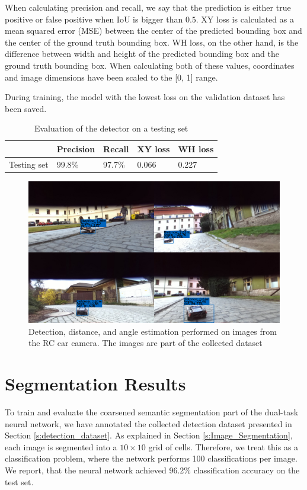 \documentclass{ctuthesis/ctuthesis}
\begin{document}
When calculating precision and recall, we say that the prediction is either true positive or false positive when IoU is bigger than $0.5$. XY loss is calculated as a mean squared error (MSE) between the center of the predicted bounding box and the center of the ground truth bounding box. WH loss, on the other hand, is the difference between width and height of the predicted bounding box and the ground truth bounding box. When calculating both of these values, coordinates and image dimensions have been scaled to the [0, 1] range. \par
During training, the model with the lowest loss on the validation dataset has been saved.

\begin{table}[]
\begin{tabular}{l|llll}
\hline
            & Precision & Recall & XY loss & WH loss \\ \hline
Testing set & 99.8\%    & 97.7\% & 0.066   & 0.227   \\ \hline
\end{tabular}
\caption{Evaluation of the detector on a testing set}\label{tab:detection}
\end{table}



\begin{figure}[]
    \centering
    \includegraphics[width=1\textwidth]{images/detection_collage.pdf}
    
    \caption{Detection, distance, and angle estimation performed on images from the RC car camera. The images are part of the collected dataset}\label{f:detection_images}
\end{figure}



\section{Segmentation Results}
To train and evaluate the coarsened semantic segmentation part of the dual-task neural network, we have annotated the collected detection dataset presented in Section \ref{s:detection_dataset}. As explained in Section \ref{s:Image_Segmentation}, each image is segmented into a $10\times 10$ grid of cells. Therefore, we treat this as a classification problem, where the network performs 100 classifications per image. We report, that the neural network achieved 96.2\% classification accuracy on the test set.
\end{document}
